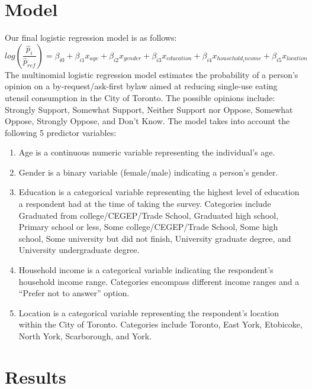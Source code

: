 \documentclass[
  letterpaper,
  DIV=11,
  numbers=noendperiod]{scrartcl}
\begin{document}
\hypertarget{model}{%
\section{Model}\label{model}}

Our final logistic regression model is as follows:
\[log(\frac{\hat{p}_i}{\hat{p}_{ref}}) = \beta_{i0} + \beta_{i1}x_{age} + \beta_{i2}x_{gender} + \beta_{i3}x_{education} + \beta_{i4}x_{household_income}+ \beta_{i5}x_{location}\]
The multinomial logistic regression model estimates the probability of a
person's opinion on a by-request/ask-first bylaw aimed at reducing
single-use eating utensil consumption in the City of Toronto. The
possible opinions include: Strongly Support, Somewhat Support, Neither
Support nor Oppose, Somewhat Oppose, Strongly Oppose, and Don't Know.
The model takes into account the following 5 predictor variables:

\begin{enumerate}
\def\labelenumi{\arabic{enumi})}
\item
  Age is a continuous numeric variable representing the individual's
  age.
\item
  Gender is a binary variable (female/male) indicating a person's
  gender.
\item
  Education is a categorical variable representing the highest level of
  education a respondent had at the time of taking the survey.
  Categories include Graduated from college/CEGEP/Trade School,
  Graduated high school, Primary school or less, Some
  college/CEGEP/Trade School, Some high school, Some university but did
  not finish, University graduate degree, and University undergraduate
  degree.
\item
  Household income is a categorical variable indicating the respondent's
  household income range. Categories encompass different income ranges
  and a ``Prefer not to answer'' option.
\item
  Location is a categorical variable representing the respondent's
  location within the City of Toronto. Categories include Toronto, East
  York, Etobicoke, North York, Scarborough, and York.
\end{enumerate}

\hypertarget{results}{%
\section{Results}\label{results}}
\end{document}
